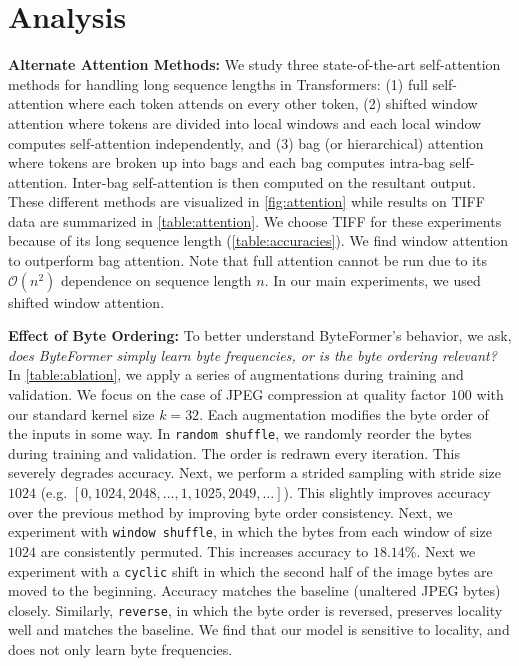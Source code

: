 \section{Analysis} \label{sec:analysis}

\textbf{Alternate Attention Methods:} We study three state-of-the-art  self-attention methods for handling long sequence lengths in Transformers: (1) full self-attention \cite{transformer, vit, li2022exploring} where each token attends on every other token, (2) shifted window attention \cite{swintransformer,beltagy2020longformer} where tokens are divided into local windows and each local window computes self-attention independently, and (3) bag (or hierarchical) attention \cite{hatnet,chen2022scaling} where tokens are broken up into bags and each bag computes intra-bag self-attention. Inter-bag self-attention is then computed on the resultant output. These different methods are visualized in \autoref{fig:attention} while results on TIFF data are summarized in \autoref{table:attention}. We choose TIFF for these experiments because of its long sequence length (\autoref{table:accuracies}). We find window attention to outperform bag attention. Note that full attention cannot be run due to its $\mathcal{O}(n^2)$ dependence on sequence length $n$. In our main experiments, we used shifted window attention.

\textbf{Effect of Byte Ordering:} To better understand ByteFormer's behavior, we ask, \textit{does ByteFormer simply learn byte frequencies, or is the byte ordering relevant?} In \autoref{table:ablation}, we apply a series of augmentations during training and validation. We focus on the case of JPEG compression at quality factor $100$ with our standard kernel size $k=32$. Each augmentation modifies the byte order of the inputs in some way. In {\tt random shuffle}, we randomly reorder the bytes during training and validation. The order is redrawn every iteration. This severely degrades accuracy. Next, we perform a strided sampling with stride size $1024$ (e.g. $[0, 1024, 2048, \ldots, 1, 1025, 2049, \ldots]$). This slightly improves accuracy over the previous method by improving byte order consistency. Next, we experiment with {\tt window shuffle}, in which the bytes from each window of size $1024$ are consistently permuted. This increases accuracy to $18.14\%$. Next we experiment with a {\tt cyclic} shift in which the second half of the image bytes are moved to the beginning. Accuracy matches the baseline (unaltered JPEG bytes) closely. Similarly, {\tt reverse}, in which the byte order is reversed, preserves locality well and matches the baseline. We find that our model is sensitive to locality, and does not only learn byte frequencies.

